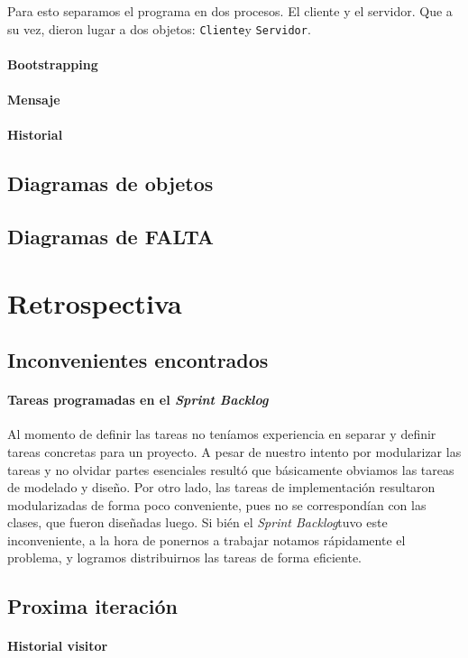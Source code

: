 \documentclass{article}
\newcommand{\sprintback}{\textit{Sprint Backlog}}
\newcommand{\cliente}{\texttt{Cliente}}
\newcommand{\servidor}{\texttt{Servidor}}
\begin{document}
    Para esto separamos el programa en dos procesos. El cliente y el servidor.
    Que a su vez, dieron lugar a dos objetos: \cliente y \servidor.

    \paragraph{Bootstrapping}

    \paragraph{Mensaje}

    \paragraph{Historial}

    \subsection{Diagramas de objetos}

    \subsection{Diagramas de FALTA}

  \section{Retrospectiva}
    \subsection{Inconvenientes encontrados}
    \paragraph{Tareas programadas en el \sprintback}
    Al momento de definir las tareas no ten\'iamos experiencia en separar y definir
    tareas concretas para un proyecto. A pesar de nuestro intento por modularizar
    las tareas y no olvidar partes esenciales result\'o que b\'asicamente obviamos
    las tareas de modelado y dise\~no. Por otro lado, las tareas de implementaci\'on
    resultaron modularizadas de forma poco conveniente, pues no se correspond\'ian
    con las clases, que fueron dise\~nadas luego. Si bi\'en el \sprintback tuvo
    este inconveniente, a la hora de ponernos a trabajar notamos r\'apidamente
    el problema, y logramos distribuirnos las tareas de forma eficiente.

    \subsection{Proxima iteraci\'on}

    \paragraph{Historial visitor}
\end{document}
